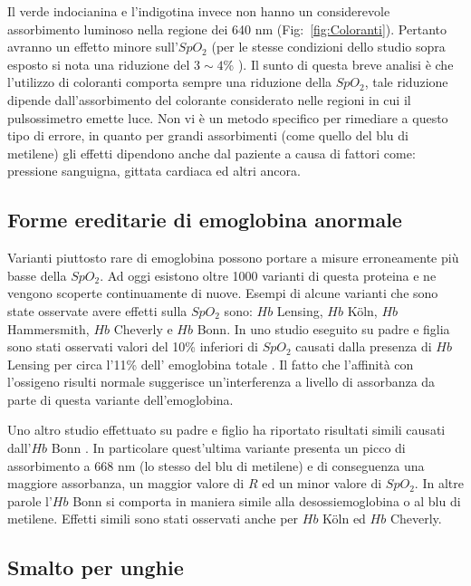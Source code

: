\documentclass[a4paper, 12pt]{book}
\begin{document}
Il verde indocianina e l'indigotina invece non hanno un considerevole assorbimento luminoso nella regione dei 640 nm (Fig:~\ref{fig:Coloranti}).
Pertanto avranno un effetto minore sull'$SpO_2$ (per le stesse condizioni dello studio sopra esposto si nota una riduzione del $3\sim4$\% ).
Il sunto di questa breve analisi è che l'utilizzo di coloranti comporta sempre una riduzione della $SpO_2$, tale riduzione dipende dall'assorbimento del colorante considerato nelle regioni in cui il pulsossimetro emette luce.
Non vi è un metodo specifico per rimediare a questo tipo di errore, in quanto per grandi assorbimenti (come quello del blu di metilene) gli effetti dipendono anche dal paziente a causa di fattori come: pressione sanguigna, gittata cardiaca ed altri ancora.


\subsection{Forme ereditarie di emoglobina anormale}

Varianti piuttosto rare di emoglobina possono portare a misure erroneamente più basse della $SpO_2$.
Ad oggi esistono oltre 1000 varianti di questa proteina e ne vengono scoperte continuamente di nuove.
Esempi di alcune varianti che sono state osservate avere effetti sulla $SpO_2$ sono: $Hb$ Lensing, $Hb$ K\"oln, $Hb$ Hammersmith, $Hb$ Cheverly e $Hb$ Bonn.
In uno studio eseguito su padre e figlia sono stati osservati valori del 10\% inferiori di $SpO_2$ causati dalla presenza di $Hb$ Lensing per circa l'11\% dell' emoglobina totale \cite{Pulseoximeter}.%
Il fatto che l'affinità con l'ossigeno risulti normale suggerisce un'interferenza a livello di assorbanza da parte di questa variante dell'emoglobina.
\newline

Uno altro studio effettuato su padre e figlio ha riportato risultati simili causati dall'$Hb$ Bonn \cite{Pulseoximeter}.%
In particolare quest'ultima variante presenta un picco di assorbimento a 668 nm (lo stesso del blu di metilene) e di conseguenza una maggiore assorbanza, un maggior valore di $R$ ed un minor valore di $SpO_2$.
In altre parole l'$Hb$ Bonn si comporta in maniera simile alla desossiemoglobina o al blu di metilene.
Effetti simili sono stati osservati anche per $Hb$ K\"oln ed $Hb$ Cheverly.


\subsection{Smalto per unghie}
\end{document}
